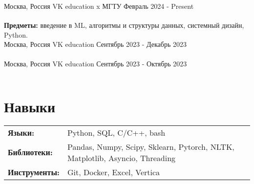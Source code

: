 \documentclass[letterpaper,10pt]{article}
\begin{document}
    \resumeEducationSubheading
    { }{ Москва, Россия }
    { VK education x МГТУ }{ Февраль 2024 - Present } \\\\
    \textbf{Предметы:} введение в ML, алгоритмы и структуры данных, системный дизайн, Python. \\

    \resumeEducationSubheading
    {}{Москва, Россия}
    {VK education}{ Сентябрь 2023 - Декабрь 2023 } \\\\

    \resumeEducationSubheading
    {}{Москва, Россия}
    {VK education}{ Сентябрь 2023 - Октябрь 2023 } \\\\
      
    
  \resumeSubHeadingListEnd

  


\section{Навыки}
 \begin{tabular}{ll}
 \textbf{Языки:} & \quad Python, SQL, C/C++, bash
 \\ 
 \textbf{Библиотеки:} & \quad Pandas, Numpy, Scipy, Sklearn, Pytorch, NLTK, Matplotlib, Asyncio, Threading \\ 
 \textbf{Инструменты:} & \quad Git, Docker, Excel, Vertica\\ 
\end{tabular}
\end{document}
